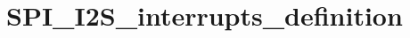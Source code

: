 \hypertarget{group___s_p_i___i2_s__interrupts__definition}{\section{S\-P\-I\-\_\-\-I2\-S\-\_\-interrupts\-\_\-definition}
\label{group___s_p_i___i2_s__interrupts__definition}
}
